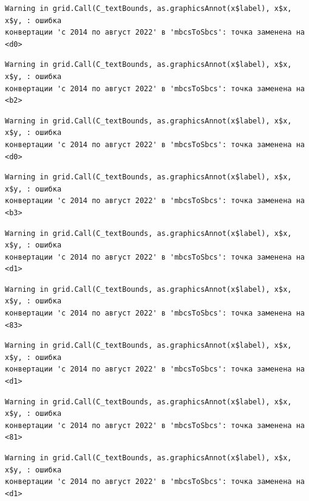 \documentclass[
  letterpaper,
  DIV=11,
  numbers=noendperiod]{scrreprt}
\begin{document}
\begin{verbatim}
Warning in grid.Call(C_textBounds, as.graphicsAnnot(x$label), x$x, x$y, : ошибка
конвертации 'с 2014 по август 2022' в 'mbcsToSbcs': точка заменена на <d0>
\end{verbatim}

\begin{verbatim}
Warning in grid.Call(C_textBounds, as.graphicsAnnot(x$label), x$x, x$y, : ошибка
конвертации 'с 2014 по август 2022' в 'mbcsToSbcs': точка заменена на <b2>
\end{verbatim}

\begin{verbatim}
Warning in grid.Call(C_textBounds, as.graphicsAnnot(x$label), x$x, x$y, : ошибка
конвертации 'с 2014 по август 2022' в 'mbcsToSbcs': точка заменена на <d0>
\end{verbatim}

\begin{verbatim}
Warning in grid.Call(C_textBounds, as.graphicsAnnot(x$label), x$x, x$y, : ошибка
конвертации 'с 2014 по август 2022' в 'mbcsToSbcs': точка заменена на <b3>
\end{verbatim}

\begin{verbatim}
Warning in grid.Call(C_textBounds, as.graphicsAnnot(x$label), x$x, x$y, : ошибка
конвертации 'с 2014 по август 2022' в 'mbcsToSbcs': точка заменена на <d1>
\end{verbatim}

\begin{verbatim}
Warning in grid.Call(C_textBounds, as.graphicsAnnot(x$label), x$x, x$y, : ошибка
конвертации 'с 2014 по август 2022' в 'mbcsToSbcs': точка заменена на <83>
\end{verbatim}

\begin{verbatim}
Warning in grid.Call(C_textBounds, as.graphicsAnnot(x$label), x$x, x$y, : ошибка
конвертации 'с 2014 по август 2022' в 'mbcsToSbcs': точка заменена на <d1>
\end{verbatim}

\begin{verbatim}
Warning in grid.Call(C_textBounds, as.graphicsAnnot(x$label), x$x, x$y, : ошибка
конвертации 'с 2014 по август 2022' в 'mbcsToSbcs': точка заменена на <81>
\end{verbatim}

\begin{verbatim}
Warning in grid.Call(C_textBounds, as.graphicsAnnot(x$label), x$x, x$y, : ошибка
конвертации 'с 2014 по август 2022' в 'mbcsToSbcs': точка заменена на <d1>
\end{verbatim}
\end{document}
